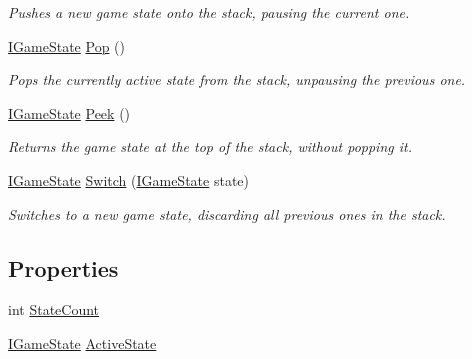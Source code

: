 \begin{DoxyCompactItemize}
\begin{DoxyCompactList}\small\item\em Pushes a new game state onto the stack, pausing the current one. \end{DoxyCompactList}\item 
\hyperlink{interface_tri_devs_1_1_tri_engine2_d_1_1_state_management_1_1_i_game_state}{I\-Game\-State} \hyperlink{class_tri_devs_1_1_tri_engine2_d_1_1_state_management_1_1_game_state_manager_a8f1e253ba7e4b07e6025c887ee41e298}{Pop} ()
\begin{DoxyCompactList}\small\item\em Pops the currently active state from the stack, unpausing the previous one. \end{DoxyCompactList}\item 
\hyperlink{interface_tri_devs_1_1_tri_engine2_d_1_1_state_management_1_1_i_game_state}{I\-Game\-State} \hyperlink{class_tri_devs_1_1_tri_engine2_d_1_1_state_management_1_1_game_state_manager_a0fa7ebccca7f275b845c3ae76cc85a50}{Peek} ()
\begin{DoxyCompactList}\small\item\em Returns the game state at the top of the stack, without popping it. \end{DoxyCompactList}\item 
\hyperlink{interface_tri_devs_1_1_tri_engine2_d_1_1_state_management_1_1_i_game_state}{I\-Game\-State} \hyperlink{class_tri_devs_1_1_tri_engine2_d_1_1_state_management_1_1_game_state_manager_aaa3ee6d6d5d0901b43b6ce6dec8c95f1}{Switch} (\hyperlink{interface_tri_devs_1_1_tri_engine2_d_1_1_state_management_1_1_i_game_state}{I\-Game\-State} state)
\begin{DoxyCompactList}\small\item\em Switches to a new game state, discarding all previous ones in the stack. \end{DoxyCompactList}\end{DoxyCompactItemize}
\subsection*{Properties}
\begin{DoxyCompactItemize}
\item 
int \hyperlink{class_tri_devs_1_1_tri_engine2_d_1_1_state_management_1_1_game_state_manager_a462438e821cbc175cf04d517c1fbdada}{State\-Count}
\item 
\hyperlink{interface_tri_devs_1_1_tri_engine2_d_1_1_state_management_1_1_i_game_state}{I\-Game\-State} \hyperlink{class_tri_devs_1_1_tri_engine2_d_1_1_state_management_1_1_game_state_manager_a31773922546e68ed67483fad253eb747}{Active\-State}
\end{DoxyCompactItemize}


